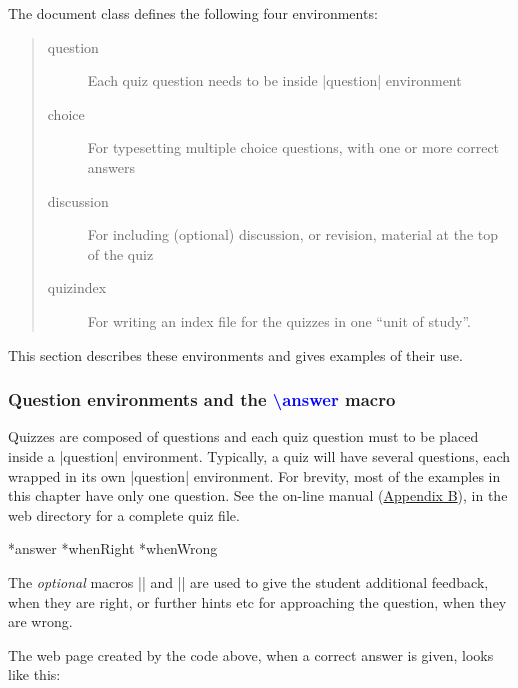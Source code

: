 \documentclass[svgnames]{article}
\makeatletter
\newcommand\macroIndex[1]{%
  \lowercase{\def\temp{#1}}%
  \expandafter\index\expandafter{\temp@\textbackslash#1}%
}
\makeatother
\begin{document}
The \WebQuiz document class defines the following four environments:
\begin{quote}
  \begin{description}
    \item[question] Each quiz question needs to be inside
    \LatexCode|question| environment
    \item[choice] For typesetting multiple choice questions, with
    one or more correct answers
    \item[discussion] For including (optional) discussion, or revision,
    material at the top of the quiz
    \item[quizindex] For writing an index file for the quizzes in
    one ``unit of study''.
  \end{description}
\end{quote}
This section describes these environments and gives examples
of their use.

\subsubsection{Question environments and the \textcolor{blue}{\textbackslash answer} macro}

Quizzes are composed of questions and each quiz question must to be
placed inside a \LatexCode|question| environment. Typically, a quiz will have
several questions, each wrapped in its own \LatexCode|question| environment.
For brevity, most of the examples in this chapter have only one
question. See the on-line manual (\hyperref[S:online]{Appendix B}), in the \WebQuiz web
directory for a complete quiz file.

  \macroIndex{answer}*{answer}
  *{whenRight}
  *{whenWrong}

  The \textit{optional} macros \LatexCode|\whenRight| and
  \LatexCode|\whenWrong| are used to give the student additional
  feedback, when they are right, or further hints etc for approaching
  the question, when they are wrong.

  The web page created by the code above, when a correct answer is
  given, looks like this:
\end{document}
